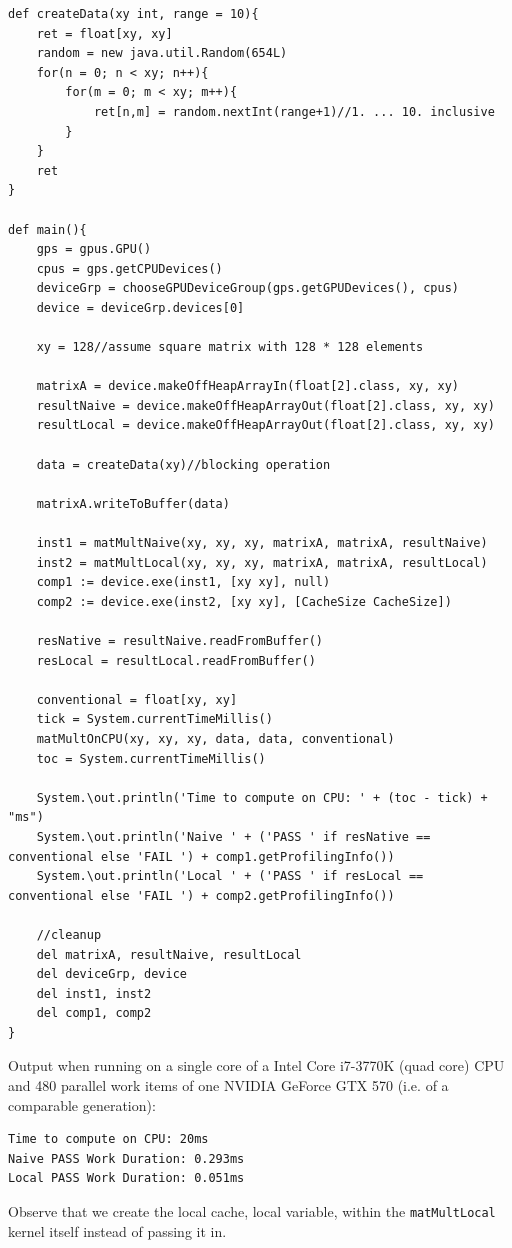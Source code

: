 \documentclass[conc-doc]{subfiles}
\begin{document}
\begin{lstlisting}
def createData(xy int, range = 10){
	ret = float[xy, xy]
	random = new java.util.Random(654L)
	for(n = 0; n < xy; n++){
		for(m = 0; m < xy; m++){
			ret[n,m] = random.nextInt(range+1)//1. ... 10. inclusive
		}
	}
	ret
}

def main(){
	gps = gpus.GPU()
	cpus = gps.getCPUDevices()
	deviceGrp = chooseGPUDeviceGroup(gps.getGPUDevices(), cpus)
	device = deviceGrp.devices[0]
	
	xy = 128//assume square matrix with 128 * 128 elements
	
	matrixA = device.makeOffHeapArrayIn(float[2].class, xy, xy)
	resultNaive = device.makeOffHeapArrayOut(float[2].class, xy, xy)
	resultLocal = device.makeOffHeapArrayOut(float[2].class, xy, xy)
	
	data = createData(xy)//blocking operation
	
	matrixA.writeToBuffer(data)
	
	inst1 = matMultNaive(xy, xy, xy, matrixA, matrixA, resultNaive)
	inst2 = matMultLocal(xy, xy, xy, matrixA, matrixA, resultLocal)
	comp1 := device.exe(inst1, [xy xy], null)
	comp2 := device.exe(inst2, [xy xy], [CacheSize CacheSize])
	
	resNative = resultNaive.readFromBuffer()
	resLocal = resultLocal.readFromBuffer()
	
	conventional = float[xy, xy]
	tick = System.currentTimeMillis()
	matMultOnCPU(xy, xy, xy, data, data, conventional)
	toc = System.currentTimeMillis()
	
	System.\out.println('Time to compute on CPU: ' + (toc - tick) + "ms")
	System.\out.println('Naive ' + ('PASS ' if resNative == conventional else 'FAIL ') + comp1.getProfilingInfo())
	System.\out.println('Local ' + ('PASS ' if resLocal == conventional else 'FAIL ') + comp2.getProfilingInfo())
	
	//cleanup
	del matrixA, resultNaive, resultLocal
	del deviceGrp, device
	del inst1, inst2
	del comp1, comp2
}
\end{lstlisting}
Output when running on a single core of a Intel Core i7-3770K (quad core) CPU and 480 parallel work items of one NVIDIA GeForce GTX 570 (i.e. of a comparable generation):

\begin{lstlisting}
Time to compute on CPU: 20ms
Naive PASS Work Duration: 0.293ms
Local PASS Work Duration: 0.051ms
\end{lstlisting}

Observe that we create the local cache, local variable, within the \lstinline{matMultLocal} kernel itself instead of passing it in.
\end{document}

